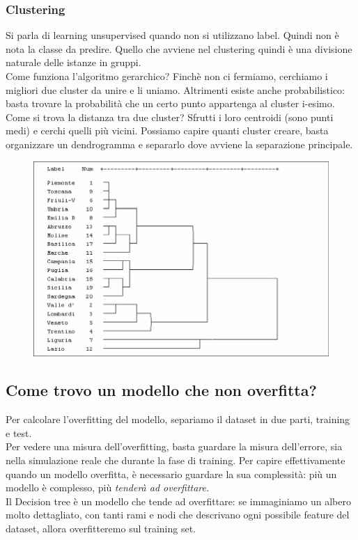 \subsubsection{Clustering}
Si parla di learning unsupervised quando non si utilizzano label. Quindi non è nota la classe da predire. Quello che avviene nel clustering quindi è una divisione naturale delle istanze in gruppi. 
\\
Come funziona l'algoritmo gerarchico? Finchè non ci fermiamo, cerchiamo i migliori due cluster da unire e li uniamo. Altrimenti esiste anche probabilistico: basta trovare la probabilità che un certo punto appartenga al cluster i-esimo. Come si trova la distanza tra due cluster? Sfrutti i loro centroidi (sono punti medi) e cerchi quelli più vicini. Possiamo capire quanti cluster creare, basta organizzare un dendrogramma e separarlo dove avviene la separazione principale. 
\\
\begin{figure}[th]
    \centering
    \includegraphics[scale=0.5]{ML/img/dendrogramma.png}
\end{figure}

\newpage

\subsection{Come trovo un modello che non overfitta?}
Per calcolare l'overfitting del modello, separiamo il dataset in due parti, training e test. 
\\
Per vedere una misura dell'overfitting, basta guardare la misura dell'errore, sia nella simulazione reale che durante la fase di training. Per capire effettivamente quando un modello overfitta, è necessario guardare la sua complessità: più un modello è complesso, più \textit{tenderà ad overfittare.}
\\
Il Decision tree è un modello che tende ad overfittare: se immaginiamo un albero molto dettagliato, con tanti rami e nodi che descrivano ogni possibile feature del dataset, allora overfitteremo sul training set.

